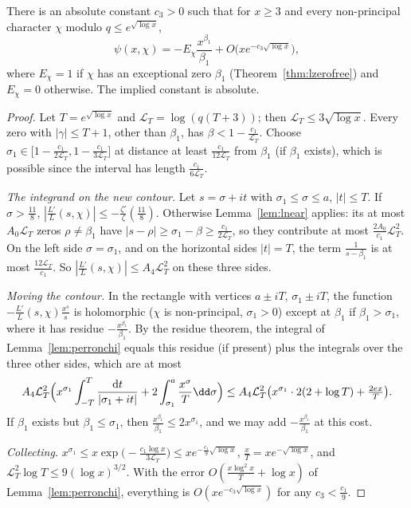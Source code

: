 \begin{theorem}\label{thm:pntchar}
There is an absolute constant $c_3>0$ such that for $x\ge3$ and every non-principal character $\chi$ modulo $q\le e^{\sqrt{\log x}}$,
\[
\psi(x,\chi)=-E_\chi\frac{x^{\beta_1}}{\beta_1}+O\bigl(xe^{-c_3\sqrt{\log x}}\bigr),
\]
where $E_\chi=1$ if $\chi$ has an exceptional zero $\beta_1$ (Theorem~\ref{thm:lzerofree}) and $E_\chi=0$ otherwise. The implied constant is absolute.
\end{theorem}
\begin{proof}
Let $T=e^{\sqrt{\log x}}$ and $\mathcal L_T=\log(q(T+3))$; then $\mathcal L_T\le3\sqrt{\log x}$. Every zero with $|\gamma|\le T+1$, other than $\beta_1$, has $\beta<1-\frac{c_1}{\mathcal L_T}$. Choose $\sigma_1\in\bigl[1-\frac{c_1}{2\mathcal L_T},1-\frac{c_1}{3\mathcal L_T}\bigr]$ at distance at least $\frac{c_1}{12\mathcal L_T}$ from $\beta_1$ (if $\beta_1$ exists),
which is possible since the interval has length $\frac{c_1}{6\mathcal L_T}$.

\emph{The integrand on the new contour.} Let $s=\sigma+it$ with $\sigma_1\le\sigma\le a$, $|t|\le T$. If $\sigma>\frac{11}8$, $|\frac{L'}L(s,\chi)|\le-\frac{\zeta'}\zeta(\frac{11}8)$. Otherwise Lemma~\ref{lem:lnear} applies: its at most $A_0\mathcal L_T$ zeros $\rho\ne\beta_1$ have $|s-\rho|\ge\sigma_1-\beta\ge\frac{c_1}{2\mathcal L_T}$, so they contribute at most $\frac{2A_0}{c_1}\mathcal L_T^2$.
On the left side $\sigma=\sigma_1$, and on the horizontal sides $|t|=T$, the term $\frac1{s-\beta_1}$ is at most $\frac{12\mathcal L_T}{c_1}$. So $|\frac{L'}L(s,\chi)|\le A_4\mathcal L_T^2$ on these three sides.

\emph{Moving the contour.} In the rectangle with vertices $a\pm iT$, $\sigma_1\pm iT$, the function $-\frac{L'}L(s,\chi)\frac{x^s}s$ is holomorphic ($\chi$ is non-principal, $\sigma_1>0$) except at $\beta_1$ if $\beta_1>\sigma_1$, where it has residue $-\frac{x^{\beta_1}}{\beta_1}$. By the residue theorem, the integral of Lemma~\ref{lem:perronchi} equals this residue (if present) plus the integrals over the three other sides, which are at most
\[
A_4\mathcal L_T^2\Bigl(x^{\sigma_1}\int_{-T}^T\frac{\mathrm dt}{|\sigma_1+it|}+2\int_{\sigma_1}^a\frac{x^\sigma}T\dd\sigma\Bigr)\le A_4\mathcal L_T^2\bigl(x^{\sigma_1}\cdot2(2+\log T)+\tfrac{2ex}T\bigr).
\]
If $\beta_1$ exists but $\beta_1\le\sigma_1$, then $\frac{x^{\beta_1}}{\beta_1}\le2x^{\sigma_1}$, and we may add $-\frac{x^{\beta_1}}{\beta_1}$ at this cost.

\emph{Collecting.} $x^{\sigma_1}\le x\exp\bigl(-\frac{c_1\log x}{3\mathcal L_T}\bigr)\le xe^{-\frac{c_1}9\sqrt{\log x}}$, $\frac xT=xe^{-\sqrt{\log x}}$, and $\mathcal L_T^2\log T\le9(\log x)^{3/2}$. With the error $O(\frac{x\log^2x}T+\log x)$ of Lemma~\ref{lem:perronchi}, everything is $O(xe^{-c_3\sqrt{\log x}})$ for any $c_3<\frac{c_1}9$.
\end{proof}

